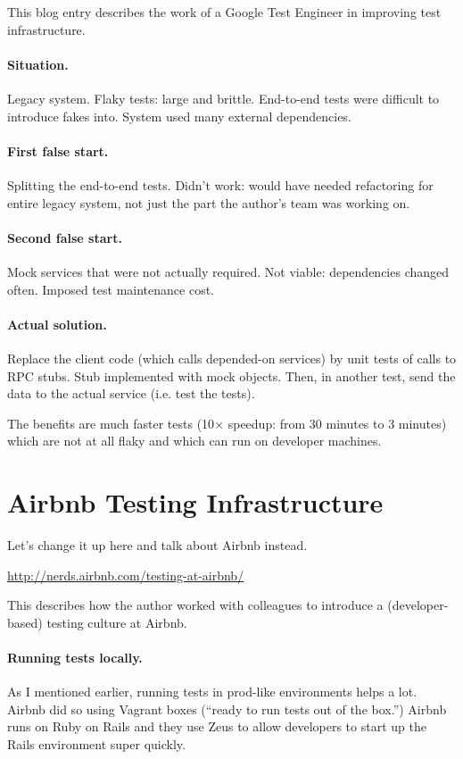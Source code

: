 \documentclass[11pt]{article}
\begin{document}
This blog entry describes the work of a Google Test Engineer in improving test infrastructure.

\paragraph{Situation.} Legacy system. Flaky tests: large and brittle. End-to-end tests
were difficult to introduce fakes into. System used many external dependencies.

\paragraph{First false start.} Splitting the end-to-end tests. Didn't work: would have needed
refactoring for entire legacy system, not just the part the author's team was working on.

\paragraph{Second false start.} Mock services that were not actually required. Not viable: 
dependencies changed often. Imposed test maintenance cost.

\paragraph{Actual solution.} Replace the client code (which calls depended-on services)
by unit tests of calls to RPC stubs. Stub implemented with mock objects.
Then, in another test, send the data to the actual service (i.e. test the tests).

The benefits are much faster tests (10$\times$ speedup: from 30 minutes to 3 minutes)
which are not at all flaky and which can run on developer machines.

\section*{Airbnb Testing Infrastructure}

Let's change it up here and talk about Airbnb instead.

\url{http://nerds.airbnb.com/testing-at-airbnb/}

This describes how the author worked with colleagues to introduce a
(developer-based) testing culture at Airbnb.

\paragraph{Running tests locally.} As I mentioned earlier, running tests
in prod-like environments helps a lot. Airbnb did so using Vagrant boxes 
(``ready to run tests out of the box.'') Airbnb runs on Ruby on Rails and 
they use Zeus to allow developers to start up the Rails environment super
quickly.
\end{document}
